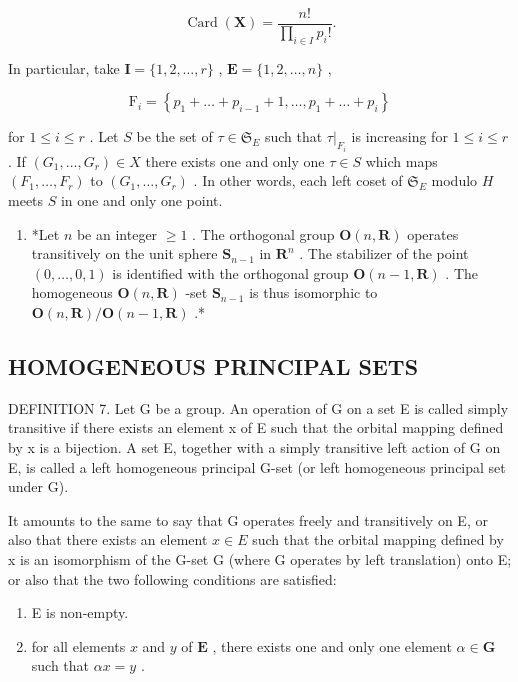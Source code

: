 \[
\operatorname{Card} (\mathbf {X}) = \frac {n !}{\prod_ {i \in I} p _ {i} !}.
\]

In particular, take \(\mathbf{I} = \{1,2,\dots,r\}\) , \(\mathbf{E} = \{1,2,\dots,n\}\) ,

\[
\mathrm{F} _ {i} = \left\{p _ {1} + \dots + p _ {i - 1} + 1, \dots , p _ {1} + \dots + p _ {i} \right\}
\]

for \(1 \leqslant i \leqslant r\) . Let \(S\) be the set of \(\tau \in \mathfrak{S}_{E}\) such that \(\tau|_{F_i}\) is increasing for \(1 \leqslant i \leqslant r\) . If \((G_1, \ldots, G_r) \in X\) there exists one and only one \(\tau \in S\) which maps \((F_1, \ldots, F_r)\) to \((G_1, \ldots, G_r)\) . In other words, each left coset of \(\mathfrak{S}_{E}\) modulo \(H\) meets \(S\) in one and only one point.

\begin{enumerate}
\def\labelenumi{(\arabic{enumi})}
\setcounter{enumi}{2}
\tightlist
\item
  *Let \(n\) be an integer \(\geqslant 1\) . The orthogonal group \(\mathbf{O}(n, \mathbf{R})\) operates transitively on the unit sphere \(\mathbf{S}_{n-1}\) in \(\mathbf{R}^n\) . The stabilizer of the point \((0, \ldots, 0, 1)\) is identified with the orthogonal group \(\mathbf{O}(n-1, \mathbf{R})\) . The homogeneous \(\mathbf{O}(n, \mathbf{R})\) -set \(\mathbf{S}_{n-1}\) is thus isomorphic to \(\mathbf{O}(n, \mathbf{R}) / \mathbf{O}(n-1, \mathbf{R})\) .*
\end{enumerate}

\subsection{HOMOGENEOUS PRINCIPAL SETS}

DEFINITION 7. Let G be a group. An operation of G on a set E is called simply transitive if there exists an element x of E such that the orbital mapping defined by x is a bijection. A set E, together with a simply transitive left action of G on E, is called a left homogeneous principal G-set (or left homogeneous principal set under G).

It amounts to the same to say that G operates freely and transitively on E, or also that there exists an element \(x \in E\) such that the orbital mapping defined by x is an isomorphism of the G-set G (where G operates by left translation) onto E; or also that the two following conditions are satisfied:

\begin{enumerate}
\def\labelenumi{(\roman{enumi})}
\item
  E is non-empty.
\item
  for all elements \(x\) and \(y\) of \(\mathbf{E}\) , there exists one and only one element \(\alpha \in \mathbf{G}\) such that \(\alpha x = y\) .
\end{enumerate}

